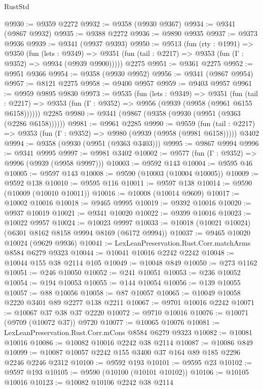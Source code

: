 \begin{lexlean}{RustStd}
\begin{coremodule}
@9930 := @9359 @2272
@9932 := @9358 (@9930 @9367)
@9934 := @9341 (@9867 @9932)
@9935 := @9388 @2272
@9936 := @9890 @9935
@9937 := @9373 @9936
@9939 := @9341 (@9937 @9393)
@9950 := @9513
    (fun (rty : @1991) =>
    @9350
      (fun (lets : @9349) =>
      @9351 (fun (tail : @2217) => @9353 (fun (Γ : @9352) => @9934 (@9939 @9900)))))
    @2275
@9951 := @9361 @2275
@9952 := @9951 @9366
@9954 := @9358 (@9930 @9952)
@9956 := @9341 (@9867 @9954)
@9957 := @8121 @2275
@9958 := @9400 @9957
@9959 := @9403 @9957
@9961 := @9959 @9895 @9830
@9973 := @9535
    (fun (lets : @9349) =>
    @9351
      (fun (tail : @2217) => @9353 (fun (Γ : @9352) => @9956 (@9939 (@9958 (@9961 @6155 @6158))))))
    @2285
@9980 := @9341 (@9867 (@9358 (@9930 (@9951 (@9363 (@2286 @6158))))))
@9981 := @9961 @2285
@9990 := @9559
    (fun (tail : @2217) => @9353 (fun (Γ : @9352) => @9980 (@9939 (@9958 (@9981 @6158)))))
    @3402
@9994 := @9358 (@9930 (@9951 (@9363 @3403)))
@9995 := @9867 @9994
@9996 := @9341 @9995
@9997 := @9981 @3402
@10002 := @9577 (fun (Γ : @9352) => @9996 (@9939 (@9958 @9997)))
@10003 := @9592 @143
@10004 := @9595 @46
@10005 := @9597 @143
@10008 := @9590 (@10003 (@10004 @10005))
@10009 := @9592 @138
@10010 := @9595 @116
@10011 := @9597 @138
@10014 := @9590 (@10009 (@10010 @10011))
@10016 := @10008 (@10014 @9609)
@10017 := @10002 @10016
@10018 := @9465 @9995
@10019 := @9392 @10016
@10020 := @9937 @10019
@10021 := @9341 @10020
@10022 := @9399 @10016
@10023 := @10022 @9957
@10024 := @10023 @9997
@10033 := @10018 (@10021 @10024) (@6301 @8162 @8158 @9994 @8169 (@6172 @9994))
@10037 := @9465 @10020 @10024 (@9629 @9936)
@10041 := LexLeanPreservation.Rust.Corr.matchArms @8584 @6279 @9323
@10044 := @10041 @10016 @2242 @2242
@10048 := @10044 @155 @38 @2114 @105
@10049 := @10048 @849
@10050 := @273 @1162
@10051 := @246 @10050
@10052 := @241 @10051
@10053 := @236 @10052
@10054 := @194 @10053
@10055 := @144 @10054
@10056 := @139 @10055
@10057 := @88 @10056
@10058 := @87 @10057
@10065 := @10049 @10058 @2220 @3401 @89 @2277 @138 @2211
@10067 := @9701 @10016 @2242
@10071 := @10067 @37 @38 @37 @2220
@10072 := @9710 @10016
@10076 := @10071 (@9709 (@10072 @37)) @9720
@10077 := @10065 @10076
@10081 := LexLeanPreservation.Rust.Corr.mCons @8584 @6279 @9323
@10082 := @10081 @10016
@10086 := @10082 @10016 @2242 @38 @2114
@10087 := @10086 @849
@10099 := @10087 @10057 @2242 @155 @3400 @37 @164 @89 @185 @2296 @2246 @2246 @2312
@10100 := @9592 @193
@10101 := @9595 @23
@10102 := @9597 @193
@10105 := @9590 (@10100 (@10101 @10102))
@10106 := @10105 @10016
@10123 := @10082
    @10106
    @2242
    @38
    @2114

\end{coremodule}
\end{lexlean}
